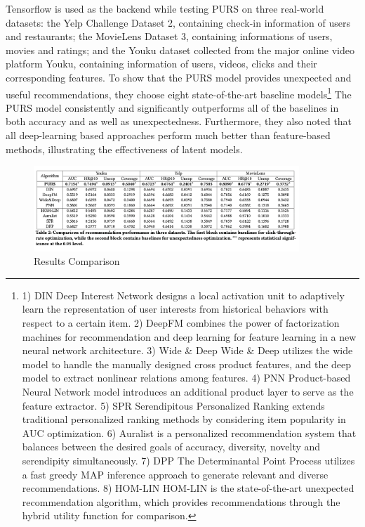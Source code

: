 Tensorflow is used as the backend while testing PURS on three real-world datasets: the Yelp Challenge Dataset 2, containing check-in information of users and restaurants; the MovieLens Dataset 3, containing informations of users, movies and ratings; and the Youku dataset collected from the major online video platform Youku, containing information of users, videos, clicks and their corresponding features. To show that the PURS model provides unexpected and useful recommendations, they choose eight state-of-the-art baseline models\footnote { 1) DIN Deep Interest Network designs a local activation unit to adaptively learn the representation of user interests from historical behaviors with respect to a certain item. 2) DeepFM combines the power of factorization machines for recommendation and deep learning for feature learning in a new neural network architecture. 3) Wide \& Deep Wide \& Deep utilizes the wide model to handle the manually designed cross product features, and the deep model to extract nonlinear relations among features. 4) PNN Product-based Neural Network model introduces an additional product layer to serve as the feature extractor. 5) SPR Serendipitous Personalized Ranking extends traditional personalized ranking methods by considering item popularity in AUC optimization. 6) Auralist is a personalized recommendation system that balances between the desired goals of accuracy, diversity, novelty and serendipity simultaneously. 7) DPP The Determinantal Point Process utilizes a fast greedy MAP inference approach to generate relevant and diverse recommendations. 8) HOM-LIN HOM-LIN is the state-of-the-art unexpected recommendation algorithm, which provides recommendations through the hybrid utility function for comparison.} The PURS model consistently and significantly outperforms all of the baselines in both accuracy and as well as unexpectedness. Furthermore, they also noted that all deep-learning based approaches perform much better than feature-based methods, illustrating the effectiveness of latent models.
\begin{figure}[ht!]
    \centering
    \includegraphics[width=100mm]{results.png}
    \caption{Results Comparison
    \label{overflow}}
\end{figure}
